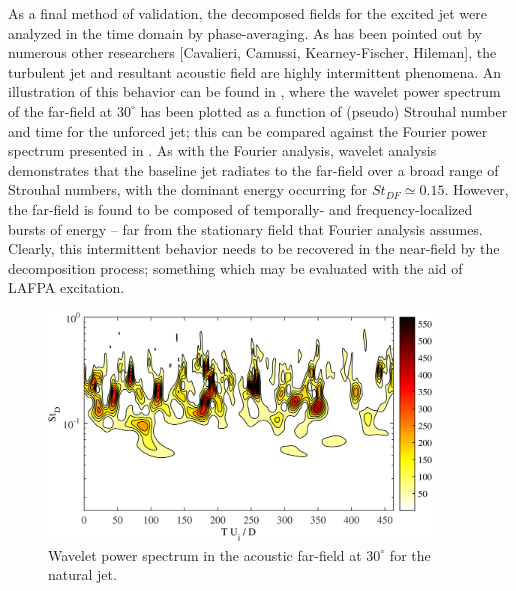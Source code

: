 As a final method of validation, the decomposed fields for the excited jet were analyzed in the time domain by phase-averaging.
As has been pointed out by numerous other researchers [Cavalieri, Camussi, Kearney-Fischer, Hileman], the turbulent jet and resultant acoustic field are highly intermittent phenomena. 
An illustration of this behavior can be found in , where the wavelet power spectrum of the far-field at $30^\circ$ has been plotted as a function of (pseudo) Strouhal number and time for the unforced jet; this can be compared against the Fourier power spectrum presented in . 
As with the Fourier analysis, wavelet analysis demonstrates that the baseline jet radiates to the far-field over a broad range of Strouhal numbers, with the dominant energy occurring for $St_{DF} \simeq 0.15$. 
However, the far-field is found to be composed of temporally- and frequency-localized bursts of energy – far from the stationary field that Fourier analysis assumes. 
Clearly, this intermittent behavior needs to be recovered in the near-field by the decomposition process; something which may be evaluated with the aid of LAFPA excitation.
\begin{figure}
	\centering
	\includegraphics[width=4in]{Figures/ch3_wavelet_spectrum.png}
	\caption{Wavelet power spectrum in the acoustic far-field at $30^\circ$ for the natural jet.}
	\label{fig:ch3_wavelet_spectrum}
\end{figure}

